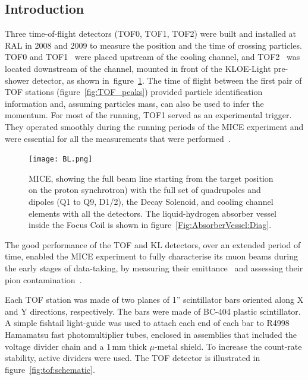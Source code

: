\subsection{Introduction}
\label{SubSect:TOF_Intro}

Three time-of-flight detectors (TOF0, TOF1, TOF2) were built and
installed at RAL in 2008 and 2009 to measure the position and the time
of crossing particles.  TOF0 and
TOF1~\cite{NOTE145}\cite{NOTE241}\cite{2010NIMPA.615...14B} were
placed upstream of the cooling channel, and TOF2~\cite{NOTE286} was
located downstream of the channel, mounted in front of the KLOE-Light pre-shower detector, as shown
in~figure~\ref{fig:BL}.
The time of flight between the first pair of TOF stations (figure~\ref{fig:TOF_peaks})
provided particle identification information and, assuming particles mass, can also be used to infer the momentum.
For most of the running, TOF1 served as an experimental trigger.
They operated smoothly during the 
running periods of the MICE experiment and were essential for all the
measurements that were performed~\cite{Rajaram:2015bra}\cite{2015ehep.confE.521B}.

\begin{figure}[!htb]
  \begin{center}
    \texttt{[image: BL.png]}
    \caption{MICE, showing the full beam line starting from the target position on the proton synchrotron) with the full set of quadrupoles and dipoles (Q1 to Q9, D1/2), the Decay Solenoid, and cooling channel elements with all the detectors. The liquid-hydrogen absorber vessel inside the Focus Coil is shown in figure~\ref{Fig:AbsorberVessel:Diag}.}
    \label{fig:BL}
  \end{center}
\end{figure}

The good performance of the TOF and KL detectors, over an extended period of time,
enabled the MICE experiment to fully characterise its muon beams during
the early stages of data-taking, by measuring their emittance~\cite{2013arXiv1306.1509T} and assessing their pion contamination~\cite{2016JInst..11P3001A}.

Each TOF station was made of two planes of 1'' scintillator bars oriented along X and Y directions, respectively.
The bars were made of BC-404 plastic scintillator. A simple fishtail light-guide was used to attach each end of each bar to R4998 Hamamatsu fast photomultiplier tubes,
enclosed in assemblies that included the voltage divider chain and a 1\,mm thick $\mu$-metal shield. To increase the count-rate stability, active
dividers were used. The TOF detector is illustrated in figure~\ref{fig:tof:schematic}.

